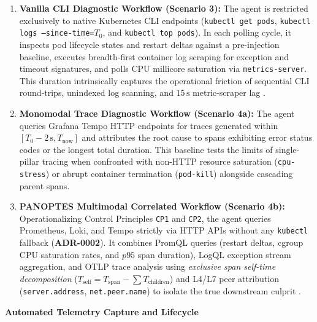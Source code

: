\begin{enumerate}
    \item \textbf{Vanilla CLI Diagnostic Workflow (Scenario 3):} The agent is restricted exclusively to native Kubernetes CLI endpoints (\texttt{kubectl get pods}, \texttt{kubectl logs --since-time=}$T_0$, and \texttt{kubectl top pods}). In each polling cycle, it inspects pod lifecycle states and restart deltas against a pre-injection baseline, executes breadth-first container log scraping for exception and timeout signatures, and polls CPU millicore saturation via \texttt{metrics-server}. This duration intrinsically captures the operational friction of sequential CLI round-trips, unindexed log scanning, and $15\,\text{s}$ metric-scraper lag \cite{wang_2024}.
    
    \item \textbf{Monomodal Trace Diagnostic Workflow (Scenario 4a):} The agent queries Grafana Tempo HTTP endpoints for traces generated within $[T_0 - 2\,\text{s}, T_{\text{now}}]$ and attributes the root cause to spans exhibiting error status codes or the longest total duration. This baseline tests the limits of single-pillar tracing when confronted with non-HTTP resource saturation (\texttt{cpu-stress}) or abrupt container termination (\texttt{pod-kill}) alongside cascading parent spans.

    \item \textbf{PANOPTES Multimodal Correlated Workflow (Scenario 4b):} Operationalizing Control Principles \texttt{CP1} and \texttt{CP2}, the agent queries Prometheus, Loki, and Tempo strictly via HTTP APIs without any \texttt{kubectl} fallback (\textbf{ADR-0002}). It combines PromQL queries (restart deltas, cgroup CPU saturation rates, and $p95$ span duration), LogQL exception stream aggregation, and OTLP trace analysis using \textit{exclusive span self-time decomposition} ($T_{\text{self}} = T_{\text{span}} - \sum T_{\text{children}}$) and L4/L7 peer attribution (\texttt{server.address}, \texttt{net.peer.name}) to isolate the true downstream culprit \cite{barata_2026}.
\end{enumerate}

\textbf{Automated Telemetry Capture and Lifecycle}

